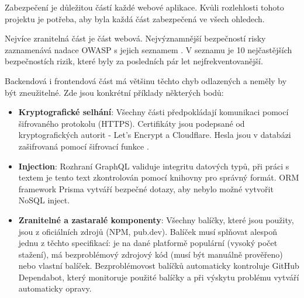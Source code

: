 Zabezpečení je důležitou částí každé webové aplikace. Kvůli rozlehlosti tohoto projektu je potřeba, aby byla každá část zabezpečená ve všech ohledech.\par
Nejvíce zranitelná část je část webová. Nejvýznamnější bezpečností risky zaznamenává nadace OWASP\cite{OWASP} s jejich seznamem \cite{OWASP-top-ten}. V seznamu je 10 nejčastějších bezpečnostích rizik, které byly za posledních pár let nejfrekventovanější.\par
Backendová i frontendová část má většinu těchto chyb odlazených a neměly by být zneužitelné. Zde jsou konkrétní příklady některých bodů:
\begin{itemize}
	\item \textbf{Kryptografické selhání}\cite{CryptographicFailures}: Všechny části předpokládají komunikaci pomocí šifrovaného protokolu (HTTPS). Certifikáty jsou podepsané od kryptografických autorit - Let's Encrypt a Cloudflare. Hesla jsou v databázi zašifrovaná pomocí šifrovací funkce \cite{bcrypt}.
	\item \textbf{Injection}\cite{Injection}: Rozhraní GraphQL validuje integritu datových typů, při práci s textem je tento text zkontrolován pomocí knihovny \cite{Validator} pro správný formát. ORM framework Prisma vytváří bezpečné dotazy, aby nebylo možné vytvořit NoSQL inject.
	\item \textbf{Zranitelné a zastaralé komponenty}\cite{VulnerableAndOutdatedComponents}: Všechny balíčky, které jsou použity, jsou z oficiálních zdrojů (NPM, pub.dev). Balíček musí splňovat alespoň jednu z těchto specifikací: je na dané platformě populární (vysoký počet stažení), má bezproblémový zdrojový kód (musí být manuálně prověřeno) nebo vlastní balíček. Bezproblémovost balíčků automaticky kontroluje GitHub Dependabot, který monitoruje použité balíčky a při výskytu problému vytváří automaticky opravy.
\end{itemize}
